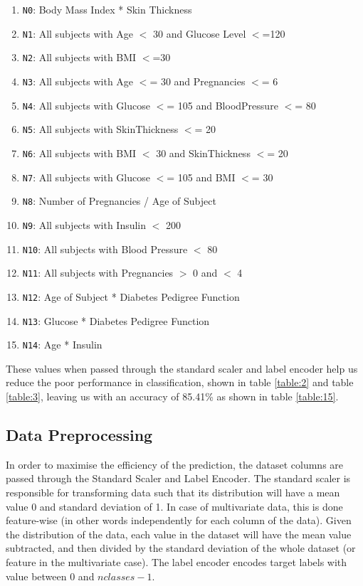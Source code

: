 \documentclass[12pt]{article}
\begin{document}
\begin{enumerate}

\item \texttt{N0}: Body Mass Index * Skin Thickness
\item \texttt{N1}: All subjects with Age $<$ 30 and Glucose Level $<$=120
\item \texttt{N2}: All subjects with BMI $<$=30
\item \texttt{N3}: All subjects with Age $<$= 30 and Pregnancies $<$= 6
\item \texttt{N4}: All subjects with Glucose $<$= 105 and BloodPressure $<$= 80
\item \texttt{N5}: All subjects with SkinThickness $<$= 20
\item \texttt{N6}: All subjects with BMI $<$ 30 and SkinThickness $<$= 20
\item \texttt{N7}: All subjects with Glucose $<$= 105 and BMI $<$= 30
\item \texttt{N8}: Number of Pregnancies / Age of Subject
\item \texttt{N9}: All subjects with Insulin $<$ 200
\item \texttt{N10}: All subjects with Blood Pressure $<$ 80
\item \texttt{N11}: All subjects with Pregnancies $>$ 0 and $<$ 4
\item \texttt{N12}: Age of Subject * Diabetes Pedigree Function
\item \texttt{N13}: Glucose * Diabetes Pedigree Function
\item \texttt{N14}: Age * Insulin
\end{enumerate} 

These values when passed through the standard scaler\cite{scikit1} and label encoder\cite{scikit2} help us reduce the poor performance in classification, shown in table \ref{table:2} and table \ref{table:3}, leaving us with an accuracy of 85.41\% as shown in table \ref{table:15}.

\newpage
\subsection{Data Preprocessing}
In order to maximise the efficiency of the prediction, the dataset columns are passed through the Standard Scaler\cite{scikit1} and Label Encoder\cite{scikit2}. The standard scaler is responsible for transforming data such that its distribution will have a mean value 0 and standard deviation of 1. In case of multivariate data, this is done feature-wise (in other words independently for each column of the data). Given the distribution of the data, each value in the dataset will have the mean value subtracted, and then divided by the standard deviation of the whole dataset (or feature in the multivariate case). The label encoder encodes target labels with value between $0$ and $nclasses-1$.
\end{document}
